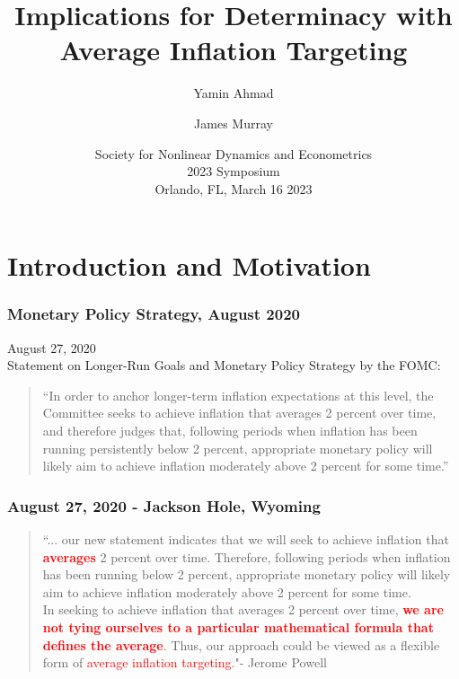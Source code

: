 \documentclass{beamer}
\begin{document}
\title[AIT-Indeterminacy]{Implications for Determinacy with Average Inflation Targeting}
\author[Ahmad]{Yamin Ahmad  \and James Murray }
\date{\color{red} Society for Nonlinear Dynamics and Econometrics \\ 2023 Symposium \color{black} \\ Orlando, FL, March 16 2023}

\begin{frame}
	\vspace{-1.5cm}
	\titlepage
\end{frame}

\section*{Introduction and Motivation}

\begin{frame}
	\frametitle{Monetary Policy Strategy, August 2020}
	August 27, 2020 \\
	\vspace{1em} 
	Statement on Longer-Run Goals and Monetary Policy Strategy by the FOMC:
	\begin{quotation}
		``In order to anchor longer-term inflation expectations at this level, the Committee seeks to achieve inflation that averages 2 percent over time, and therefore judges that, following periods when inflation has been running persistently below 2 percent, appropriate monetary policy will likely aim to achieve inflation moderately above 2 percent for some time.''
	\end{quotation} 
\end{frame}

\begin{frame}
	\frametitle{August 27, 2020 - Jackson Hole, Wyoming}
	\begin{quotation}
		``... our new statement indicates that we will seek to achieve inflation that \textbf{\textcolor{red}{averages}} 2 percent over time. Therefore, following periods when inflation has been running below 2 percent, appropriate monetary policy will likely aim to achieve inflation moderately above 2 percent for some time. \\
		
		In seeking to achieve inflation that averages 2 percent over time, \textbf{\textcolor{red}{we are not tying ourselves to a particular mathematical formula that defines the average}}. Thus, our approach could be viewed as a flexible form of \textcolor{red}{average inflation targeting}."- Jerome Powell
	\end{quotation} 
\end{frame}
\end{document}
